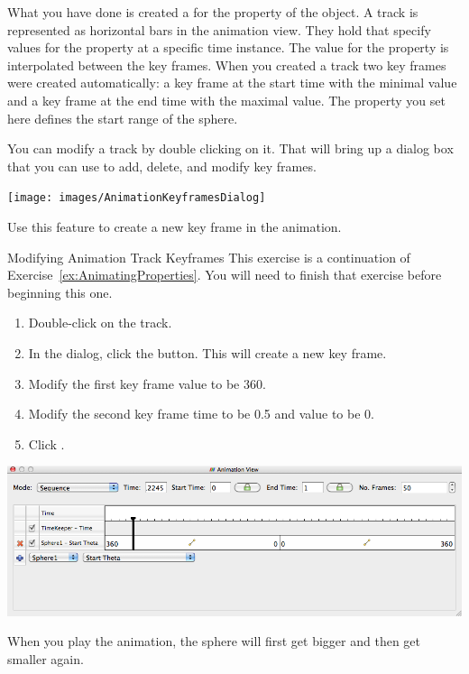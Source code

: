 What you have done is created a  for the 
property of the  object.  A track is represented as horizontal
bars in the animation view.  They hold  that specify
values for the property at a specific time instance.  The value for the
property is interpolated between the key frames.  When you created a track
two key frames were created automatically: a key frame at the start time
with the minimal value and a key frame at the end time with the maximal
value.  The property you set here defines the start range of the sphere.

You can modify a track by double clicking on it.  That will bring up a
dialog box that you can use to add, delete, and modify key frames.

\begin{inlinefig}
  \texttt{[image: images/AnimationKeyframesDialog]}
\end{inlinefig}

Use this feature to create a new key frame in the animation.

\begin{exercise}{Modifying Animation Track Keyframes}
  \label{ex:ModifyingAnimationTrackKeyframes}%
  This exercise is a continuation of Exercise~\ref{ex:AnimatingProperties}.
  You will need to finish that exercise before beginning this one.

  \begin{enumerate}
  \item Double-click on the  track.
  \item In the  dialog, click the 
    button.  This will create a new key frame.
  \item Modify the first key frame value to be 360.
  \item Modify the second key frame time to be 0.5 and value to be 0.
  \item Click .
  \end{enumerate}

  \begin{inlinefig}
    \includegraphics[width=.9\linewidth]{images/BuildAnimation2}
  \end{inlinefig}

  When you play the animation, the sphere will first get bigger and then get
  smaller again.
\end{exercise}

